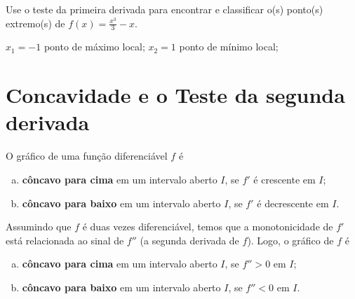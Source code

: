 \begin{exer}
    Use o teste da primeira derivada para encontrar e classificar o(s) ponto(s) extremo(s) de $\displaystyle f(x) = \frac{x^3}{3}-x$.
\end{exer}
\begin{resp}
  $x_1=-1$ ponto de máximo local; $x_2=1$ ponto de mínimo local;
\end{resp}


\section{Concavidade e o Teste da segunda derivada}\label{cap_apderiv_sec_tder2}

O gráfico de uma função diferenciável $f$ é
\begin{enumerate}[a)]
\item {\bf côncavo para cima} em um intervalo aberto $I$, se $f'$ é crescente em $I$;
\item {\bf côncavo para baixo} em um intervalo aberto $I$, se $f'$ é decrescente em $I$.
\end{enumerate}

Assumindo que $f$ é duas vezes diferenciável, temos que a monotonicidade de $f'$ está relacionada ao sinal de $f''$ (a segunda derivada de $f$). Logo, o gráfico de $f$ é
\begin{enumerate}[a)]
\item {\bf côncavo para cima} em um intervalo aberto $I$, se $f'' > 0$ em $I$;
\item {\bf côncavo para baixo} em um intervalo aberto $I$, se $f'' < 0$ em $I$.
\end{enumerate}

